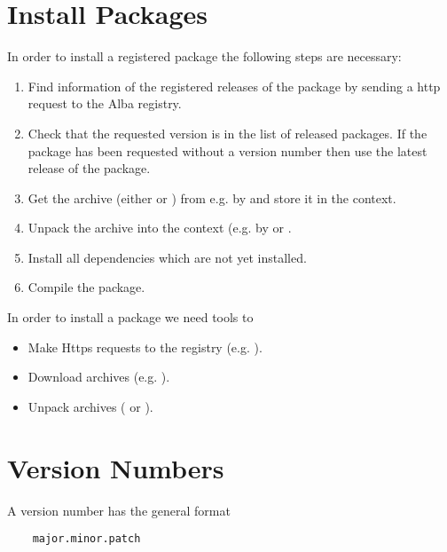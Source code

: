 \section{Install Packages}

In order to install a registered package  the following
steps are necessary:
\begin{enumerate}

\item Find information of the registered releases of the package
   by sending a http request to the Alba registry.

\item Check that the requested version is in the list of released packages. If
  the package has been requested without a version number then use the latest
  release of the package.

\item Get the archive (either  or ) from
   e.g. by  and store it in the context.

\item Unpack the archive into the context (e.g. by 
  or .

\item Install all dependencies which are not yet installed.

\item Compile the package.
\end{enumerate}


\noindent In order to install a package we need tools to
%
\begin{itemize}
\item Make Https requests to the registry (e.g. ).
\item Download archives (e.g. ).
\item Unpack archives ( or ).
\end{itemize}


\section{Version Numbers}

A version number has the general format

\begin{verbatim}
    major.minor.patch
\end{verbatim}

